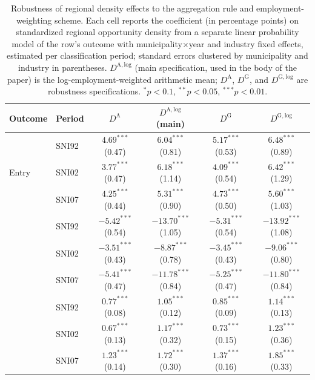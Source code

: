 \begin{table}[htbp]
\centering
\caption{Robustness of regional density effects to the aggregation rule and
employment-weighting scheme. Each cell reports the coefficient (in
percentage points) on standardized regional opportunity density from a
separate linear probability model of the row's outcome with
municipality$\times$year and industry fixed effects, estimated per
classification period; standard errors clustered by municipality and
industry in parentheses. $D^{\mathrm{A,log}}$ (main specification, used
in the body of the paper) is the log-employment-weighted arithmetic mean;
$D^{\mathrm{A}}$, $D^{\mathrm{G}}$, and $D^{\mathrm{G,log}}$ are robustness
specifications. $^{*}p<0.1$, $^{**}p<0.05$, $^{***}p<0.01$.}
\label{tab:density_robustness}
\begin{tabular}{llcccc}
\toprule
Outcome & Period & $D^{\mathrm{A}}$ & $D^{\mathrm{A,log}}$ (main) & $D^{\mathrm{G}}$ & $D^{\mathrm{G,log}}$ \\
\midrule
\multirow{3}{*}{Entry}
 & SNI92 & $4.69^{***}$ (0.47) & $\mathbf{6.04^{***}}$ (0.81) & $5.17^{***}$ (0.53) & $6.48^{***}$ (0.89) \\
 & SNI02 & $3.77^{***}$ (0.47) & $\mathbf{6.18^{***}}$ (1.14) & $4.09^{***}$ (0.54) & $6.42^{***}$ (1.29) \\
 & SNI07 & $4.25^{***}$ (0.44) & $\mathbf{5.31^{***}}$ (0.90) & $4.73^{***}$ (0.50) & $5.60^{***}$ (1.03) \\
\addlinespace
\multirow{3}{*}{Exit}
 & SNI92 & $-5.42^{***}$ (0.54) & $\mathbf{-13.70^{***}}$ (1.05) & $-5.31^{***}$ (0.54) & $-13.92^{***}$ (1.08) \\
 & SNI02 & $-3.51^{***}$ (0.43) & $\mathbf{-8.87^{***}}$ (0.78) & $-3.45^{***}$ (0.43) & $-9.06^{***}$ (0.80) \\
 & SNI07 & $-5.41^{***}$ (0.47) & $\mathbf{-11.78^{***}}$ (0.84) & $-5.25^{***}$ (0.47) & $-11.80^{***}$ (0.84) \\
\addlinespace
\multirow{3}{*}{Startup formation}
 & SNI92 & $0.77^{***}$ (0.08) & $\mathbf{1.05^{***}}$ (0.12) & $0.85^{***}$ (0.09) & $1.14^{***}$ (0.13) \\
 & SNI02 & $0.67^{***}$ (0.13) & $\mathbf{1.17^{***}}$ (0.32) & $0.73^{***}$ (0.15) & $1.23^{***}$ (0.36) \\
 & SNI07 & $1.23^{***}$ (0.14) & $\mathbf{1.72^{***}}$ (0.30) & $1.37^{***}$ (0.16) & $1.85^{***}$ (0.33) \\
\bottomrule
\end{tabular}
\end{table}
